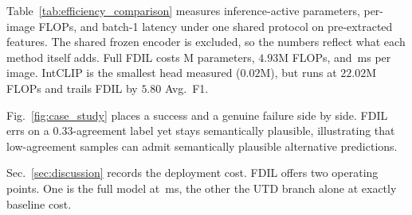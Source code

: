 {

 Table~\ref{tab:efficiency_comparison} measures inference-active parameters, per-image FLOPs, and batch-1 latency under one shared protocol on pre-extracted features. The shared frozen encoder is excluded, so the numbers reflect what each method itself adds. Full FDIL costs M parameters, $4.93$M FLOPs, and \,ms per image.  IntCLIP is the smallest head measured ($0.02$M), but runs at $22.02$M FLOPs and trails FDIL by $5.80$ Avg.\ F1.

 Fig.~\ref{fig:case_study} places a success and a genuine failure side by side. FDIL errs on a $0.33$-agreement label yet stays semantically plausible, illustrating that low-agreement samples can admit semantically plausible alternative predictions.

 Sec.~\ref{sec:discussion} records the deployment cost. FDIL offers two operating points. One is the full model at \,ms, the other the UTD branch alone at exactly baseline cost.
}
\showEfficiencyComparison
\showCaseStudy
\showPerClassAttr
